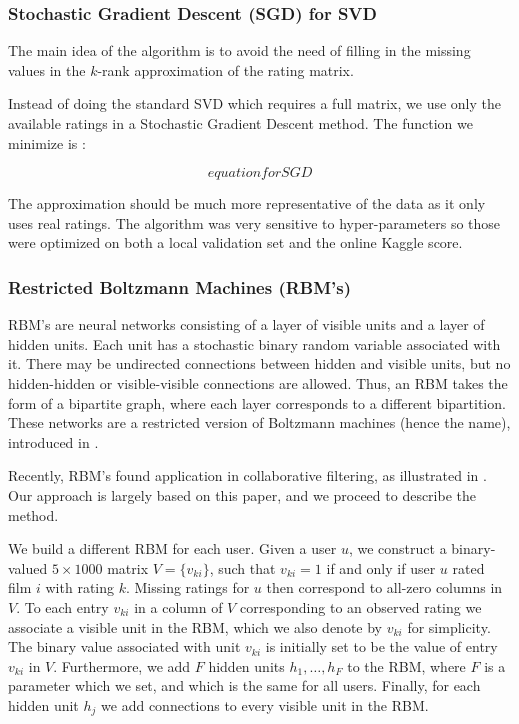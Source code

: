 \documentclass[10pt,conference,compsocconf]{IEEEtran}
\begin{document}
\subsubsection*{\textbf{Stochastic Gradient Descent (SGD) for SVD}} The main idea of the algorithm is to avoid the need of filling in the missing values in the $k$-rank approximation of the rating matrix. 

Instead of doing the standard SVD which requires a full matrix, we use only the available ratings in a Stochastic Gradient Descent method. The function we minimize is :

\begin{equation}
equation for SGD
\end{equation}

The approximation should be much more representative of the data as it only uses real ratings. The algorithm was very sensitive to hyper-parameters so those were optimized on both a local validation set and the online Kaggle score. 

\subsubsection*{\textbf{Restricted Boltzmann Machines (RBM's)}}

RBM's are neural networks consisting of a layer of visible units and a layer of hidden units. Each unit has a stochastic binary random variable associated with it. There may be undirected connections between hidden and visible units, but no hidden-hidden or visible-visible connections are allowed. Thus, an RBM takes the form of a bipartite graph, where each layer corresponds to a different bipartition. These networks are a restricted version of Boltzmann machines (hence the name), introduced in \cite{AHS85}.

Recently, RBM's found application in collaborative filtering, as illustrated in \cite{SMH07}. Our approach is largely based on this paper, and we proceed to describe the method.

We build a different RBM for each user. Given a user $u$, we construct a binary-valued $5\times 1000$ matrix $V=\{v_{ki}\}$, such that $v_{ki}=1$ if and only if user $u$ rated film $i$ with rating $k$. Missing ratings for $u$ then correspond to all-zero columns in $V$. To each entry $v_{ki}$ in a column of $V$ corresponding to an observed rating we associate a visible unit in the RBM, which we also denote by $v_{ki}$ for simplicity. The binary value associated with unit $v_{ki}$ is initially set to be the value of entry $v_{ki}$ in $V$. Furthermore, we add $F$ hidden units $h_1,\dots,h_F$ to the RBM, where $F$ is a parameter which we set, and which is the same for all users. Finally, for each hidden unit $h_j$ we add connections to every visible unit in the RBM.
\end{document}
